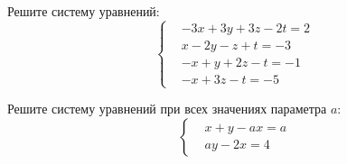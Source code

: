 %
%



\begin{problems}

\item
Решите систему уравнений:
\[\left\{\begin{aligned}&
    -3x +3y +3z -2t =  2
\\&
      x -2y  -z  +t = -3
\\&
     -x  +y +2z  -t = -1
\\&
     -x     +3z  -t = -5
\end{aligned}\right.\]

\item
Решите систему уравнений при всех значениях параметра ${a}$:
\[\left\{\begin{aligned}&
    x + y - {a} x = {a}
\\&
    {a} y - 2 x = 4
\end{aligned}\right.\]

\end{problems}


